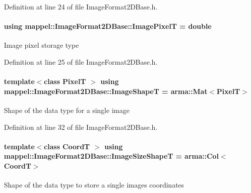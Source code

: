 Definition at line 24 of file Image\+Format2\+D\+Base.\+h.

\paragraph[{\texorpdfstring{Image\+PixelT}{ImagePixelT}}]{\setlength{\rightskip}{0pt plus 5cm}using {\bf mappel\+::\+Image\+Format2\+D\+Base\+::\+Image\+PixelT} =  double\hspace{0.3cm}{\ttfamily [inherited]}}\hypertarget{classmappel_1_1ImageFormat2DBase_af6bae6f78398ab1eacb39726a05adeef}{}\label{classmappel_1_1ImageFormat2DBase_af6bae6f78398ab1eacb39726a05adeef}
Image pixel storage type 

Definition at line 25 of file Image\+Format2\+D\+Base.\+h.

\paragraph[{\texorpdfstring{Image\+ShapeT}{ImageShapeT}}]{\setlength{\rightskip}{0pt plus 5cm}template$<$class PixelT $>$ using {\bf mappel\+::\+Image\+Format2\+D\+Base\+::\+Image\+ShapeT} =  arma\+::\+Mat$<$PixelT$>$\hspace{0.3cm}{\ttfamily [inherited]}}\hypertarget{classmappel_1_1ImageFormat2DBase_ac40fc3773b5668601c63905876cca732}{}\label{classmappel_1_1ImageFormat2DBase_ac40fc3773b5668601c63905876cca732}
Shape of the data type for a single image 

Definition at line 32 of file Image\+Format2\+D\+Base.\+h.

\paragraph[{\texorpdfstring{Image\+Size\+ShapeT}{ImageSizeShapeT}}]{\setlength{\rightskip}{0pt plus 5cm}template$<$class CoordT $>$ using {\bf mappel\+::\+Image\+Format2\+D\+Base\+::\+Image\+Size\+ShapeT} =  arma\+::\+Col$<$CoordT$>$\hspace{0.3cm}{\ttfamily [inherited]}}\hypertarget{classmappel_1_1ImageFormat2DBase_a23c1a9e9f1482852aa0cf4951efe7c48}{}\label{classmappel_1_1ImageFormat2DBase_a23c1a9e9f1482852aa0cf4951efe7c48}
Shape of the data type to store a single image\textquotesingle{}s coordinates 


